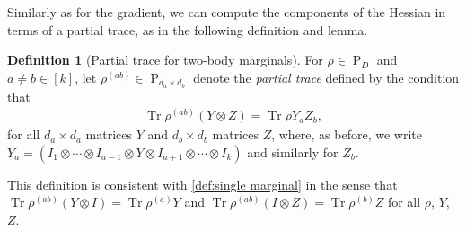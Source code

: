 \documentclass[aos]{imsart}
\theoremstyle{definition}
\newtheorem{definition}{Definition}
\DeclareMathOperator{\tr}{Tr}
\newcommand{\ot}{\otimes}
\newcommand{\PD}{\operatorname{P}}
\newcommand{\CF}[1]{{\color{purple}[CF: #1]}}
\begin{document}
Similarly as for the gradient, we can compute the components of the Hessian in terms of a partial trace, as in the following definition and lemma.

\begin{definition}[Partial trace for two-body marginals]
For $\rho \in \PD_D$ and $a \neq b\in[k]$, let $\rho^{(ab)} \in \PD_{d_a \times d_b}$ denote the \emph{partial trace} defined by the condition that
\begin{align*}
  \tr \rho^{(ab)} (Y \ot Z) = \tr \rho Y_a Z_b,
\end{align*}
for all $d_a \times d_a$ matrices $Y$ and $d_b \times d_b$ matrices $Z$, where, as before, we write~$Y_a = (I_1 \ot \cdots \ot I_{a-1} \ot Y \ot I_{a+1} \ot \cdots \ot I_k)$ and similarly for $Z_b$. %
\end{definition}

\noindent
This definition is consistent with \cref{def:single marginal} in the sense that $\tr \rho^{(ab)} (Y \ot I) = \tr \rho^{(a)} Y$ and $\tr \rho^{(ab)} (I \ot Z) = \tr \rho^{(b)} Z$ for all $\rho$, $Y$, $Z$.
\end{document}
